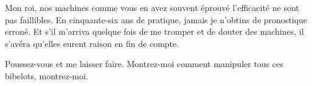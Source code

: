 \begin{drama}
  \medecinspeaks Mon roi, nos machines comme vous en avez souvent éprouvé l’efficacité ne sont pas faillibles. En cinquante-six ans de pratique, jamais je n’obtins de pronostique erroné. Et s’il m’arriva quelque fois de me tromper et de douter des machines, il s’avéra qu’elles eurent raison en fin de compte.

  \roispeaks {} Poussez-vous et me laisser faire.  Montrez-moi comment manipuler tous ces bibelots, montrez-moi.

\end{drama}


\scene

\StageDirII{\elena, \reine}



